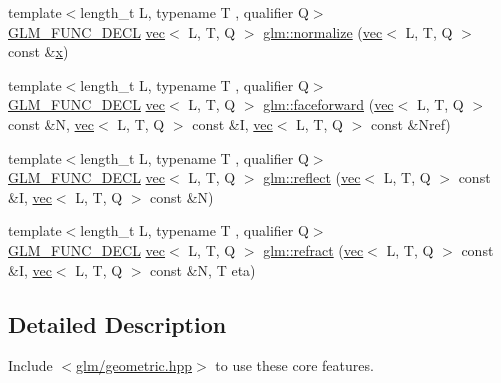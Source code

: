 \begin{DoxyCompactItemize}
\item 
{\footnotesize template$<$length\+\_\+t L, typename T , qualifier Q$>$ }\\\mbox{\hyperlink{setup_8hpp_ab2d052de21a70539923e9bcbf6e83a51}{G\+L\+M\+\_\+\+F\+U\+N\+C\+\_\+\+D\+E\+CL}} \mbox{\hyperlink{structglm_1_1vec}{vec}}$<$ L, T, Q $>$ \mbox{\hyperlink{group__core__func__geometric_ga3b8d3dcae77870781392ed2902cce597}{glm\+::normalize}} (\mbox{\hyperlink{structglm_1_1vec}{vec}}$<$ L, T, Q $>$ const \&\mbox{\hyperlink{_s_d_l__opengl_8h_ad0e63d0edcdbd3d79554076bf309fd47}{x}})
\item 
{\footnotesize template$<$length\+\_\+t L, typename T , qualifier Q$>$ }\\\mbox{\hyperlink{setup_8hpp_ab2d052de21a70539923e9bcbf6e83a51}{G\+L\+M\+\_\+\+F\+U\+N\+C\+\_\+\+D\+E\+CL}} \mbox{\hyperlink{structglm_1_1vec}{vec}}$<$ L, T, Q $>$ \mbox{\hyperlink{group__core__func__geometric_ga7aed0a36c738169402404a3a5d54e43b}{glm\+::faceforward}} (\mbox{\hyperlink{structglm_1_1vec}{vec}}$<$ L, T, Q $>$ const \&N, \mbox{\hyperlink{structglm_1_1vec}{vec}}$<$ L, T, Q $>$ const \&I, \mbox{\hyperlink{structglm_1_1vec}{vec}}$<$ L, T, Q $>$ const \&Nref)
\item 
{\footnotesize template$<$length\+\_\+t L, typename T , qualifier Q$>$ }\\\mbox{\hyperlink{setup_8hpp_ab2d052de21a70539923e9bcbf6e83a51}{G\+L\+M\+\_\+\+F\+U\+N\+C\+\_\+\+D\+E\+CL}} \mbox{\hyperlink{structglm_1_1vec}{vec}}$<$ L, T, Q $>$ \mbox{\hyperlink{group__core__func__geometric_ga5631dd1d5618de5450b1ea3cf3e94905}{glm\+::reflect}} (\mbox{\hyperlink{structglm_1_1vec}{vec}}$<$ L, T, Q $>$ const \&I, \mbox{\hyperlink{structglm_1_1vec}{vec}}$<$ L, T, Q $>$ const \&N)
\item 
{\footnotesize template$<$length\+\_\+t L, typename T , qualifier Q$>$ }\\\mbox{\hyperlink{setup_8hpp_ab2d052de21a70539923e9bcbf6e83a51}{G\+L\+M\+\_\+\+F\+U\+N\+C\+\_\+\+D\+E\+CL}} \mbox{\hyperlink{structglm_1_1vec}{vec}}$<$ L, T, Q $>$ \mbox{\hyperlink{group__core__func__geometric_ga01da3dff9e2ef6b9d4915c3047e22b74}{glm\+::refract}} (\mbox{\hyperlink{structglm_1_1vec}{vec}}$<$ L, T, Q $>$ const \&I, \mbox{\hyperlink{structglm_1_1vec}{vec}}$<$ L, T, Q $>$ const \&N, T eta)
\end{DoxyCompactItemize}


\subsection{Detailed Description}
Include $<$\mbox{\hyperlink{geometric_8hpp}{glm/geometric.\+hpp}}$>$ to use these core features.

